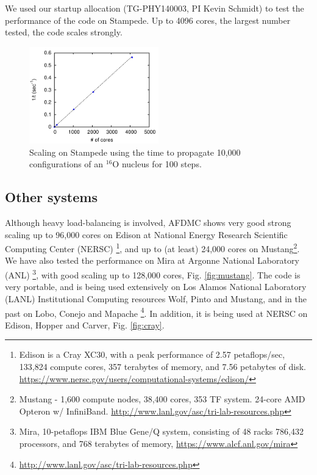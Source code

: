 \documentclass[12pt,letterpaper]{article}
\begin{document}
We used our startup allocation (TG-PHY140003, PI Kevin Schmidt) to test the 
performance of the code on Stampede. Up to 4096 cores, the 
largest number tested, the code scales strongly.%

\begin{figure}[h]
   \centering
   \includegraphics[width=0.5\textwidth]{stampede.pdf}
   \caption{Scaling on Stampede using the time to propagate 10,000 
   configurations of an $^{16}$O nucleus for 100 steps.}
   \label{fig:scaling}
\end{figure}

\subsection{Other systems}

Although heavy load-balancing is
involved, AFDMC shows very good strong scaling up to 96,000 cores on Edison 
at National Energy Research Scientific Computing Center (NERSC)
\footnote{Edison is a Cray XC30, with a peak performance of 2.57 
petaflops/sec, 133,824 compute cores, 357 terabytes of memory, and 7.56 
petabytes of disk.
\url{https://www.nersc.gov/users/computational-systems/edison/}
}, and
up to (at least) 24,000 cores on Mustang\footnote{
Mustang - 1,600 compute nodes, 38,400 cores, 353 TF system. 24-core AMD 
Opteron w/ InfiniBand. \url{http://www.lanl.gov/asc/tri-lab-resources.php}
}. 
We have also tested the performance on Mira at Argonne National Laboratory 
(ANL)
\footnote{
Mira, 10-petaflops IBM Blue Gene/Q system, consisting of 48 racks 786,432 
processors, and 768 terabytes of memory,
\url{https://www.alcf.anl.gov/mira}
}, with good scaling up to 128,000 cores, Fig. \ref{fig:mustang}. The code 
is very portable, and is being used extensively on Los Alamos National 
Laboratory (LANL) Institutional 
Computing resources
Wolf, Pinto and Mustang, and in the past on Lobo, Conejo and Mapache
\footnote{\url{http://www.lanl.gov/asc/tri-lab-resources.php}}.
In addition, it is being used at NERSC on Edison, Hopper and Carver, Fig. 
\ref{fig:cray}.
\end{document}
